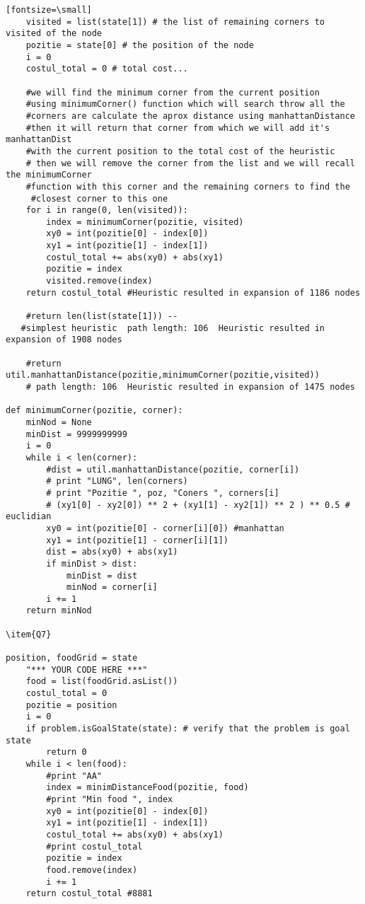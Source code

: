 \begin{verbatim}[fontsize=\small]
    visited = list(state[1]) # the list of remaining corners to visited of the node
    pozitie = state[0] # the position of the node
    i = 0
    costul_total = 0 # total cost...

    #we will find the minimum corner from the current position
    #using minimumCorner() function which will search throw all the
    #corners are calculate the aprox distance using manhattanDistance
    #then it will return that corner from which we will add it's manhattanDist
    #with the current position to the total cost of the heuristic
    # then we will remove the corner from the list and we will recall the minimumCorner
    #function with this corner and the remaining corners to find the 
     #closest corner to this one
    for i in range(0, len(visited)):
        index = minimumCorner(pozitie, visited)
        xy0 = int(pozitie[0] - index[0])
        xy1 = int(pozitie[1] - index[1])
        costul_total += abs(xy0) + abs(xy1)
        pozitie = index
        visited.remove(index)
    return costul_total #Heuristic resulted in expansion of 1186 nodes

    #return len(list(state[1])) -- 
   #simplest heuristic  path length: 106  Heuristic resulted in expansion of 1908 nodes

    #return util.manhattanDistance(pozitie,minimumCorner(pozitie,visited))
    # path length: 106  Heuristic resulted in expansion of 1475 nodes

def minimumCorner(pozitie, corner):
    minNod = None
    minDist = 9999999999
    i = 0
    while i < len(corner):
        #dist = util.manhattanDistance(pozitie, corner[i])
        # print "LUNG", len(corners)
        # print "Pozitie ", poz, "Coners ", corners[i]
        # (xy1[0] - xy2[0]) ** 2 + (xy1[1] - xy2[1]) ** 2 ) ** 0.5 # euclidian
        xy0 = int(pozitie[0] - corner[i][0]) #manhattan
        xy1 = int(pozitie[1] - corner[i][1])
        dist = abs(xy0) + abs(xy1)
        if minDist > dist:
            minDist = dist
            minNod = corner[i]
        i += 1
    return minNod

\item{Q7}

position, foodGrid = state
    "*** YOUR CODE HERE ***"
    food = list(foodGrid.asList())
    costul_total = 0
    pozitie = position
    i = 0
    if problem.isGoalState(state): # verify that the problem is goal state
        return 0
    while i < len(food):
        #print "AA"
        index = minimDistanceFood(pozitie, food)
        #print "Min food ", index
        xy0 = int(pozitie[0] - index[0])
        xy1 = int(pozitie[1] - index[1])
        costul_total += abs(xy0) + abs(xy1)
        #print costul_total
        pozitie = index
        food.remove(index)
        i += 1
    return costul_total #8881


\end{verbatim}
